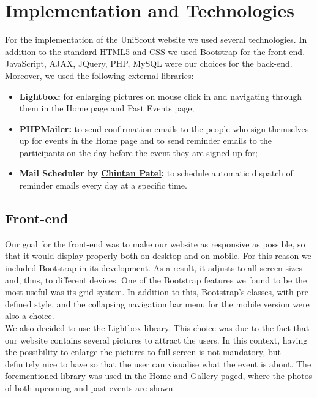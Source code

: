 \documentclass[a4paper]{article}
\begin{document}
	\section{Implementation and Technologies}
	For the implementation of the UniScout website we used several technologies. In addition to the standard HTML5 and CSS we used Bootstrap for the front-end. JavaScript, AJAX, JQuery, PHP, MySQL were our choices for the back-end.\\
	Moreover, we used the following external libraries:
	\begin{itemize}
		\item \textbf{Lightbox:} for enlarging pictures on mouse click in and navigating through them in the Home page and Past Events page;
		\item \textbf{PHPMailer:} to send confirmation emails to the people who sign themselves up for events in the Home page and to send reminder emails to the participants on the day before the event they are signed up for;
		\item \textbf{Mail Scheduler by \href{https://chynten.wordpress.com/2016/06/03/java-scheduler-to-run-every-day-on-specific-time/}{Chintan Patel}:} to schedule automatic dispatch of reminder emails every day at a specific time.
	\end{itemize}
	
	\subsection{Front-end}
	Our goal for the front-end was to make our website as responsive as possible, so that it would display properly both on desktop and on mobile. For this reason we included Bootstrap in its development. As a result, it adjusts to all screen sizes and, thus, to  different devices. One of the Bootstrap features we found to be the most useful was its grid system. In addition to this, Bootstrap's classes, with pre-defined style, and the collapsing navigation bar menu for the mobile version were also a choice.\\
	We also decided to use the Lightbox library. This choice was due to the fact that our website contains several pictures to attract the users. In this context, having the possibility to enlarge the pictures to full screen is not mandatory, but definitely nice to have so that the user can visualise what the event is about. The forementioned library was used in the Home and Gallery paged, where the photos of both upcoming and past events are shown.
	
\end{document}
